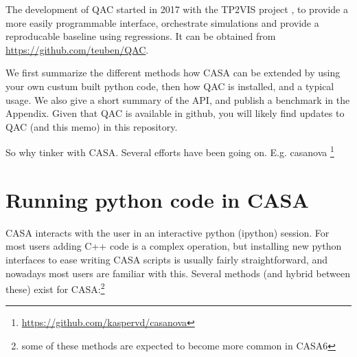 \documentclass[11pt,twoside]{article}
\begin{document}

The development of QAC started in 2017 with the TP2VIS project \citep{tp2vis}, to provide a
more easily programmable interface, orchestrate simulations and provide a
reproducable baseline using regressions. It can be obtained from \url{https://github.com/teuben/QAC}.

We first summarize the different methods how CASA can be extended by using your own
custum built python code, then how QAC is installed, and a typical usage. We also give a short
summary of the API, and publish a benchmark in the Appendix. Given that QAC is available
in github, you will likely find updates to QAC (and this memo) in this repository.

So why tinker with CASA. Several efforts have been going on. E.g. casanova
\footnote{\url{https://github.com/kaspervd/casanova}}



\section{Running python code in CASA}

CASA interacts with the user in an interactive python (ipython) session. For most users adding 
C++ code is a complex operation, but installing new python interfaces to ease writing CASA scripts
is usually fairly straightforward, and nowadays most users are familiar with this.
Several methods (and hybrid between these) exist
for CASA:\footnote{some of these methods are expected to become more common in CASA6}
\end{document}
